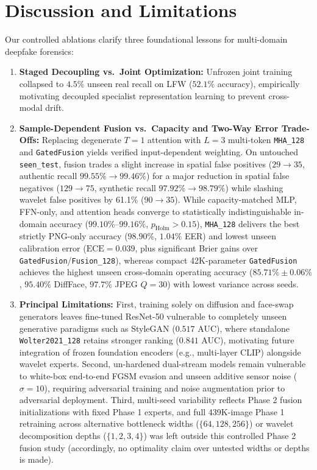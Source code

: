 \documentclass[fleqn,10pt]{wlscirep}
\begin{document}
\section*{Discussion and Limitations}
Our controlled ablations clarify three foundational lessons for multi-domain deepfake forensics:
\begin{enumerate}
    \item \textbf{Staged Decoupling vs.\ Joint Optimization:} Unfrozen joint training collapsed to $4.5\%$ unseen real recall on LFW ($52.1\%$ accuracy), empirically motivating decoupled specialist representation learning to prevent cross-modal drift.
    \item \textbf{Sample-Dependent Fusion vs.\ Capacity and Two-Way Error Trade-Offs:} Replacing degenerate $T=1$ attention with $L=3$ multi-token \texttt{MHA\_128} and \texttt{GatedFusion} yields verified input-dependent weighting. On untouched \texttt{seen\_test}, fusion trades a slight increase in spatial false positives ($29 \to 35$, authentic recall $99.55\% \to 99.46\%$) for a major reduction in spatial false negatives ($129 \to 75$, synthetic recall $97.92\% \to 98.79\%$) while slashing wavelet false positives by 61.1\% ($90 \to 35$). While capacity-matched MLP, FFN-only, and attention heads converge to statistically indistinguishable in-domain accuracy ($99.10\%$--$99.16\%$, $p_{\text{Holm}}>0.15$), \texttt{MHA\_128} delivers the best strictly PNG-only accuracy ($98.90\%$, $1.04\%$ EER) and lowest unseen calibration error ($\text{ECE}=0.039$, plus significant Brier gains over \texttt{GatedFusion}/\texttt{Fusion\_128}), whereas compact 42K-parameter \texttt{GatedFusion} achieves the highest unseen cross-domain operating accuracy ($85.71\% \pm 0.06\%$, $95.40\%$ DiffFace, $97.7\%$ JPEG $Q=30$) with lowest variance across seeds.
    \item \textbf{Principal Limitations:} First, training solely on diffusion and face-swap generators leaves fine-tuned ResNet-50 vulnerable to completely unseen generative paradigms such as StyleGAN ($0.517$ AUC), where standalone \texttt{Wolter2021\_128} retains stronger ranking ($0.841$ AUC), motivating future integration of frozen foundation encoders (e.g., multi-layer CLIP) alongside wavelet experts. Second, un-hardened dual-stream models remain vulnerable to white-box end-to-end FGSM evasion and unseen additive sensor noise ($\sigma=10$), requiring adversarial training and noise augmentation prior to adversarial deployment. Third, multi-seed variability reflects Phase 2 fusion initializations with fixed Phase 1 experts, and full 439K-image Phase 1 retraining across alternative bottleneck widths ($\{64,128,256\}$) or wavelet decomposition depths ($\{1,2,3,4\}$) was left outside this controlled Phase 2 fusion study (accordingly, no optimality claim over untested widths or depths is made).
\end{enumerate}
\end{document}
